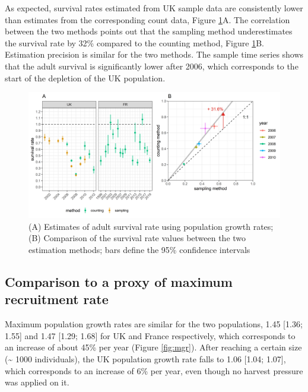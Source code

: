 \documentclass[
  english,
]{article}
\begin{document}
As expected, survival rates estimated from UK sample data are consistently lower than estimates from the corresponding count data, Figure \ref{fig:srts}A. The correlation between the two methods points out that the sampling method underestimates the survival rate by 32\% compared to the counting method, Figure \ref{fig:srts}B. Estimation precision is similar for the two methods. The sample time series shows that the adult survival is significantly lower after 2006, which corresponds to the start of the depletion of the UK population.

\begin{figure}[H]

{\centering \includegraphics[width=1\linewidth]{../Output/plot_5} 

}

\caption{(A) Estimates of adult survival rate using population growth rates; (B) Comparison of the survival rate values between the two estimation methods; bars define the 95\% confidence intervals}\label{fig:srts}
\end{figure}

\hypertarget{comparison-to-a-proxy-of-maximum-recruitment-rate-1}{%
\subsection{Comparison to a proxy of maximum recruitment rate}\label{comparison-to-a-proxy-of-maximum-recruitment-rate-1}}

Maximum population growth rates are similar for the two populations, 1.45 {[}1.36; 1.55{]} and 1.47 {[}1.29; 1.68{]} for UK and France respectively, which corresponds to an increase of about 45\% per year (Figure \ref{fig:mgr}). After reaching a certain size (\textasciitilde{} 1000 individuals), the UK population growth rate falls to 1.06 {[}1.04; 1.07{]}, which corresponds to an increase of 6\% per year, even though no harvest pressure was applied on it.
\end{document}
